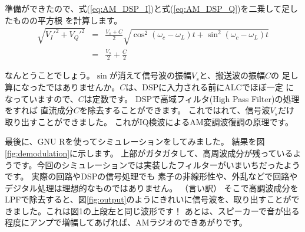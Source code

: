 準備ができたので、式(\ref{eq:AM_DSP_I})と式(\ref{eq:AM_DSP_Q})を二乗して足したものの平方根
を計算します。
\begin{eqnarray}
\sqrt{V_I'^2 + V_Q'^2} &=& \frac{V_s+C}{2}\sqrt{\cos^2(\omega_c - \omega_L)t + \sin^2(\omega_c - \omega_L)t }\\
&=& \frac{V_s}{2} + \frac{C}{2} 
\end{eqnarray}

なんとうことでしょう。$\sin$が消えて信号波の振幅$V_s$と、搬送波の振幅$C$の
足し算になったではありませんか。$C$は、DSPに入力される前にALCでほぼ一定
になっていますので、$C$は定数です。
DSPで高域フィルタ(High Pass Filter)の処理をすれば
直流成分$C$を除去することができます。
これではれて、信号波$V_s$だけ取り出すことができました。
これがIQ検波によるAM変調波復調の原理です。

最後に、GNU Rを使ってシミュレーションをしてみました。
結果を図\ref{fig:demodulation}に示します。
上部がガタガタして、高周波成分が残っているようです。今回のシミュレーションでは実装したフィルターがいまいちだったようです。
実際の回路やDSPの信号処理でも
素子の非線形性や、外乱などで回路やデジタル処理は理想的なものではありません。
（言い訳）
そこで高調波成分をLPFで除去すると、図\ref{fig:output}のようにきれいに信号波を、取り出すことができました。これは図1の上段左と同じ波形です！
あとは、スピーカーで音が出る程度にアンプで増幅してあげれば、AMラジオのできあがりです。
